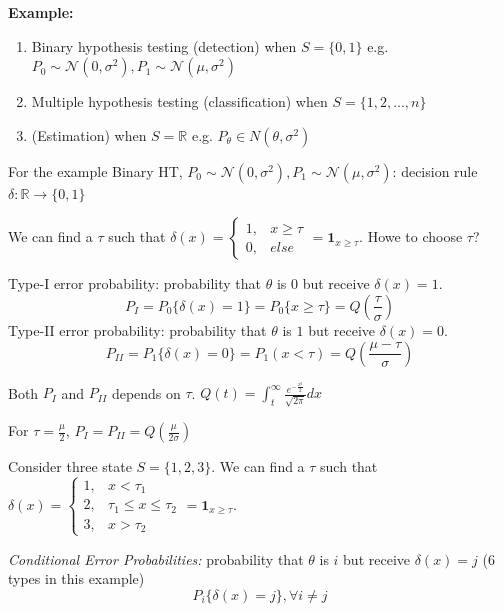 \documentclass[11pt]{elegantbook}
\begin{document}
\textbf{Example:}
\begin{enumerate}[(1)]
    \item Binary hypothesis testing (detection) when $S=\{0,1\}$ e.g. $P_0\sim \mathcal{N}(0,\sigma^2), P_1\sim \mathcal{N}(\mu,\sigma^2)$
    \item Multiple hypothesis testing (classification) when $S=\{1,2,...,n\}$
    \item (Estimation) when $S=\mathbb{R}$ e.g. $P_\theta\in N(\theta,\sigma^2)$
\end{enumerate}
\begin{example}[ (Binary HT)]
    For the example Binary HT, $P_0\sim \mathcal{N}(0,\sigma^2), P_1\sim \mathcal{N}(\mu,\sigma^2)$: decision rule $\delta: \mathbb{R} \rightarrow \{0,1\}$

    We can find a $\tau$ such that $\delta(x)=\left\{\begin{matrix}
        1,&x\ge \tau\\
        0,& else
    \end{matrix}\right.=\mathbf{1}_{x\geq \tau}$. Howe to choose $\tau$?
    
    Type-I error probability: probability that $\theta$ is $0$ but receive $\delta(x)=1$. $$P_I=P_0\{\delta(x)=1\}=P_0\{x\geq \tau\}=Q\left(\frac{\tau}{\sigma}\right)$$
    Type-II error probability: probability that $\theta$ is $1$ but receive $\delta(x)=0$. $$P_{II}=P_1\{\delta(x)=0\}=P_1(x<\tau)=Q(\frac{\mu-\tau}{\sigma})$$
    
    Both $P_I$ and $P_{II}$ depends on $\tau$. $Q(t)=\int_t^\infty\frac{e^{-\frac{x^2}{2}}}{\sqrt{2\pi}}dx$
    
    For $\tau=\frac{\mu}{2}$, $P_I=P_{II}=Q\left(\frac{\mu}{2\sigma}\right)$
\end{example}

\begin{example}[ (Multiple HT)]
    Consider three state $S=\{1,2,3\}$.
    We can find a $\tau$ such that $\delta(x)=\left\{\begin{matrix}
        1,&x< \tau_1\\
        2,& \tau_1\leq x\leq \tau_2\\
        3,& x>\tau_2
    \end{matrix}\right.=\mathbf{1}_{x\geq \tau}$.
    
    \textit{Conditional Error Probabilities:} probability that $\theta$ is $i$ but receive $\delta(x)=j$ (6 types in this example) $$P_i\{\delta(x)=j\}, \forall i\neq j$$
\end{example}
\end{document}
